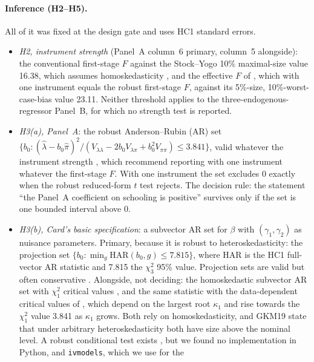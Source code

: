 \documentclass[11pt]{article}
\newcommand{\var}[1]{\texttt{#1}}
\begin{document}
\paragraph{Inference (H2--H5).} All of it was fixed at the design gate and uses HC1
standard errors.
\begin{itemize}
\item \emph{H2, instrument strength} (Panel~A column~6 primary, column~5 alongside): the
conventional first-stage $F$ against the Stock--Yogo 10\% maximal-size value 16.38, which
assumes homoskedasticity \citep{stock2002testing,stock2005testing}, and the effective $F$ of
\citet{montielolea2013robust}, which with one instrument equals the robust first-stage $F$,
against its 5\%-size, 10\%-worst-case-bias value 23.11. Neither threshold applies to the
three-endogenous-regressor Panel~B, for which no strength test is reported.
\item \emph{H3(a), Panel~A}: the robust Anderson--Rubin (AR) set
$\{b_0 : (\hat\lambda - b_0\hat\pi)^2 / (V_{\lambda\lambda} - 2b_0V_{\lambda\pi} +
b_0^2V_{\pi\pi}) \le 3.841\}$, valid whatever the instrument strength
\citep{anderson1949estimation,andrews2019weak}, which \citet{andrews2019weak} recommend
reporting with one instrument whatever the first-stage $F$. With one instrument the set
excludes 0 exactly when the robust reduced-form $t$ test rejects. The decision rule: the
statement ``the Panel~A coefficient on schooling is positive'' survives only if the set is
one bounded interval above 0.
\item \emph{H3(b), Card's basic specification}: a subvector AR set for $\beta$ with
$(\gamma_1,\gamma_2)$ as nuisance parameters. Primary, because it is robust to
heteroskedasticity: the projection set $\{b_0 : \min_g \mathrm{HAR}(b_0, g) \le 7.815\}$,
where $\mathrm{HAR}$ is the HC1 full-vector AR statistic and 7.815 the $\chi^2_3$ 95\%
value. Projection sets are valid but often conservative \citep{andrews2019weak}.
Alongside, not deciding: the homoskedastic subvector AR set with $\chi^2_1$ critical values
\citep[GKMC]{guggenberger2012asymptotic}, and the same statistic with the data-dependent
critical values of \citet[GKM19]{guggenberger2019more}, which depend on the largest root
$\kappa_1$ and rise towards the $\chi^2_1$ value 3.841 as $\kappa_1$ grows. Both rely on
homoskedasticity, and GKM19 state that under arbitrary heteroskedasticity both have size
above the nominal level. A robust conditional test exists \citep{guggenberger2024powerful},
but we found no implementation in Python, and \var{ivmodels}, which we use for the

\end{itemize}
\end{document}
